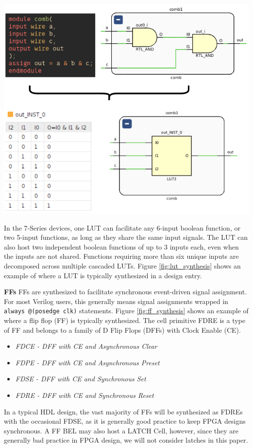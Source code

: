 \documentclass{article}
\begin{document}
\begin{multicols}{2}
        {
            \centering
            \includegraphics[width=\columnwidth]{figures/lut_synthesis.png}
            \label{fig:lut_synthesis}
        }
        \vspace{1.0cm}

        In the 7‑Series devices, one LUT can facilitate any 6-input boolean function, or two 5-input functions, as long as they share the same input signals.  
        The LUT can also host two independent boolean functions of up to 3 inputs each, even when the inputs are not shared.  
        Functions requiring more than six unique inputs are decomposed across multiple cascaded LUTs.
        Figure \ref{fig:lut_synthesis} shows an example of where a LUT is typically synthesized in a design entry. 


    \textbf{FFs} \quad
        FFs are synthesized to facilitate synchronous event-driven signal assignment. 
        For most Verilog users, this generally means signal assignments wrapped in \texttt{always @(posedge clk)} statements. 
        Figure \ref{fig:ff_synthesis} shows an example of where a flip flop (FF) is typically synthesized. 
        The cell primitive FDRE is a type of FF and belongs to a family of D Flip Flops (DFFs) with Clock Enable (CE). 
        \begin{itemize}
            \item \emph{FDCE - DFF with CE and Asynchronous Clear}
            \item \emph{FDPE - DFF with CE and Asynchronous Preset}
            \item \emph{FDSE - DFF with CE and Synchronous Set}
            \item \emph{FDRE - DFF with CE and Synchronous Reset}
        \end{itemize}
        In a typical HDL design, the vast majority of FFs will be synthesized as FDREs with the occasional FDSE, as it is generally good practice to keep FPGA designs synchronous. 
        A FF BEL may also host a LATCH Cell, however, since they are generally bad practice in FPGA design, we will not consider latches in this paper. 


\end{multicols}
\end{document}
